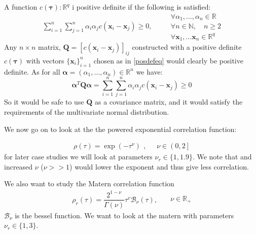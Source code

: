 \documentclass[]{article}
\newcommand{\vect}[1]{\ensuremath{\boldsymbol{\mathbf{#1}}}}
\newcommand{\matr}[1]{\ensuremath{\boldsymbol{\mathbf{#1}}}}
\begin{document}
A function \(c(\vect \tau): \mathbb{R}^q\) i positive definite if the
following is satisfied: \begin{equation}\label{posdefeq}
    \begin{split}
        \sum_{i=1}^n\sum_{j=1}^n\alpha_i\alpha_j c(\vect x_i - \vect x_j) \geq 0,
    \end{split}
    \quad
    \begin{split}
        &\forall \alpha_1, \dots, \alpha_n \in \mathbb{R} \\
        &\forall n \in \mathbb{N}, \quad n \geq 2 \\
        &\forall \vect x_1, \dots \vect x_n \in \mathbb{R}^q
  \end{split}
\end{equation} Any \(n \times n\) matrix,
\(\matr Q = \left[ c(\vect x_i - \vect x_j) \right]_{ij}\) constructed
with a positive definite \(c(\vect \tau)\) with vectors
\(\lbrace \vect x_i \rbrace_{i=1}^n\) chosen as in \eqref{posdefeq}
would clearly be positive definite. As for all
\(\vect \alpha = (\alpha_1, \dots, \alpha_n) \in \mathbb{R}^n\) we have:
\begin{equation}
    \vect \alpha^T \matr Q \vect \alpha =   \sum_{i=1}^n\sum_{j=1}^n\alpha_i\alpha_j c(\vect x_i - \vect x_j) \geq 0
\end{equation} So it would be safe to use \(\matr Q\) as a covariance
matrix, and it would satisfy the requirements of the multivariate normal
distribution.

We now go on to look at the the powered exponential correlation
function:

\begin{equation}
    \begin{split}
            \rho(\tau) = \exp(-\tau^{\nu}) 
    \end{split}, \quad
    \begin{split}
    \nu \in \left(0, 2 \right]
    \end{split}
\end{equation} for later case studies we will look at parameters
\(\nu_r \in \lbrace 1, 1.9 \rbrace\). We note that and increased \(\nu\)
(\(\nu >> 1\)) would lower the exponent and thus give less correlation.

We also want to study the Matern correlation function \begin{equation}
    \begin{split}
            \rho_r(\tau) = \dfrac{2^{1-\nu}}{\Gamma(\nu)}\tau^v\mathcal{B}_\nu(\tau), \quad
    \end{split}
    \begin{split}
        \nu \in \mathbb{R}_+
    \end{split}
\end{equation} \(\mathcal{B}_\nu\) is the bessel function. We want to
look at the matern with parameters \(\nu_r \in \lbrace 1, 3 \rbrace\).
\end{document}
